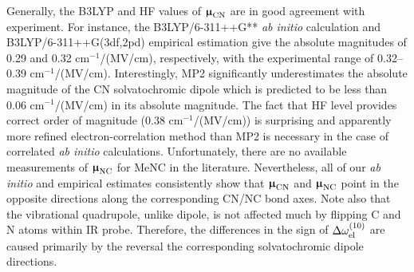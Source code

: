 \documentclass[a4paper,titlepage,twoside,fleqn,12pt]{book}
\newcommand{\BM}[1]{\bm{#1}}
\begin{document}
\begin{refsection}
Generally, the B3LYP and HF values of ${\BM \upmu}_{\rm CN}$ are in good agreement with experiment.
For
instance, the B3LYP/6-311++G** \emph{ab initio} calculation and B3LYP/6-311++G(3df,2pd) 
empirical estimation give the absolute magnitudes of 0.29 and 0.32 cm$^{-1}$/(MV/cm), 
respectively, with the experimental range of 0.32--0.39 cm$^{-1}$/(MV/cm). Interestingly, MP2 
significantly underestimates the absolute magnitude of the CN solvatochromic dipole which 
is predicted to be less than 0.06 cm$^{-1}$/(MV/cm) in its absolute magnitude. The fact that 
HF level provides correct order of magnitude (0.38 cm$^{-1}$/(MV/cm)) is surprising and 
apparently more refined electron\hyp{}correlation method than MP2 is necessary in the case of 
correlated \emph{ab initio} calculations. Unfortunately, there are no available measurements of ${\BM \upmu}_{\rm NC}$
for MeNC in the literature. Nevertheless, all of our \emph{ab initio} and empirical estimates 
consistently show that ${\BM \upmu}_{\rm CN}$ and ${\BM \upmu}_{\rm NC}$ 
point in the opposite directions along the
corresponding CN/NC bond axes. Note also that the vibrational quadrupole, unlike dipole, is 
not affected much by flipping C and N atoms within IR probe.
Therefore, the differences in the
sign of $\Delta\omega^{(10)}_{\rm el}$
are caused primarily by the reversal the corresponding solvatochromic 
dipole directions.


\end{refsection}
\end{document}
